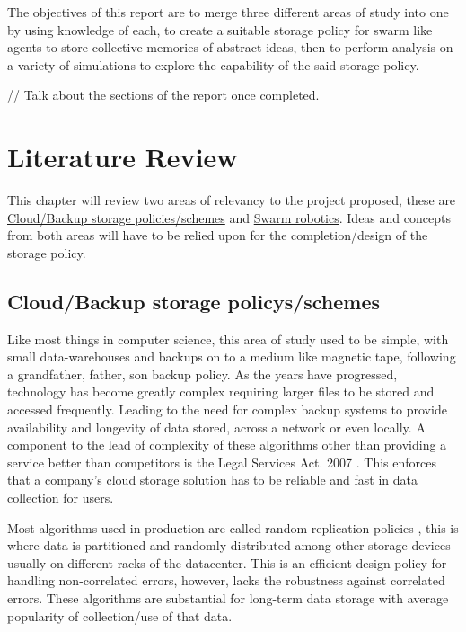 \documentclass{UoYCSproject}
\begin{document}
The objectives of this report are to merge three different areas of study into one by using knowledge of each, to create a suitable storage policy for swarm like agents to store collective memories of abstract ideas, then to perform analysis on a variety of simulations to explore the capability of the said storage policy.

// Talk about the sections of the report once completed.

\chapter{Literature Review}
\label{cha:Literature Review}

This chapter will review two areas of relevancy to the project proposed, these are \hyperref[sec:Cloud]{Cloud/Backup storage policies/schemes} and \hyperref[sec:Robotics]{Swarm robotics}. 
Ideas and concepts from both areas will have to be relied upon for the completion/design of the storage policy.

\section{Cloud/Backup storage policys/schemes}
\label{sec:Cloud}

Like most things in computer science, this area of study used to be simple, with small data-warehouses and backups on to a medium like magnetic tape, following a grandfather, father, son backup policy.
As the years have progressed, technology has become greatly complex requiring larger files to be stored and accessed frequently. 
Leading to the need for complex backup systems to provide availability and longevity of data stored, across a network or even locally.
A component to the lead of complexity of these algorithms other than providing a service better than competitors is the Legal Services Act. 2007 \cite{LSA}. 
This enforces that a company's cloud storage solution has to be reliable and fast in data collection for users.

Most algorithms used in production are called random replication policies \cite{Avalability storage}, this is where data is partitioned and randomly distributed among other storage devices usually on different racks of the datacenter.
This is an efficient design policy for handling non-correlated errors, however, lacks the robustness against correlated errors.
These algorithms are substantial for long-term data storage with average popularity of collection/use of that data.
\end{document}
